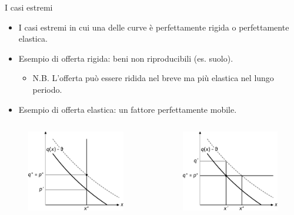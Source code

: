 \documentclass[aspectratio=64,12pt]{beamer}
\begin{document}
\begin{frame}{I casi estremi}
\begin{itemize}
\item I casi estremi in cui una delle curve è perfettamente rigida o perfettamente elastica.
\item Esempio di offerta rigida: beni non riproducibili (es. suolo).
  \begin{itemize}
  \item N.B. L'offerta può essere ridida nel breve ma più elastica nel lungo
    periodo.
\end{itemize}
\item Esempio di offerta elastica: un fattore perfettamente mobile.
\end{itemize}

\begin{columns}
\begin{column}{.5\columnwidth}
\begin{figure}[htbp]
\centering
\includegraphics[width=.8\textwidth]{./figure/incidenza-7.pdf}
\end{figure}
\end{column}

\begin{column}{.5\columnwidth}
\begin{figure}[htbp]
\centering
\includegraphics[width=.8\textwidth]{./figure/incidenza-8.pdf}
\end{figure}
\end{column}
\end{columns}
\end{frame}
\end{document}
